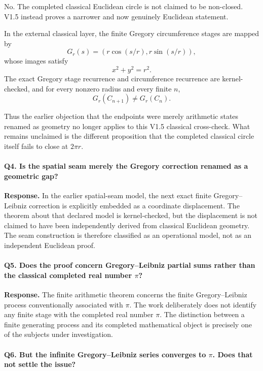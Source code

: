 \documentclass[11pt,a4paper]{article}
\begin{document}
No.  The completed classical Euclidean circle is not claimed to be
non-closed.  V1.5 instead proves a narrower and now genuinely
Euclidean statement.

In the external classical layer, the finite Gregory circumference
stages are mapped by
\[
G_r(s)
=
\left(
r\cos(s/r),
r\sin(s/r)
\right),
\]
whose images satisfy
\[
x^2+y^2=r^2.
\]
The exact Gregory stage recurrence and circumference recurrence are
kernel-checked, and for every nonzero radius and every finite $n$,
\[
G_r(C_{n+1})
\neq
G_r(C_n).
\]

Thus the earlier objection that the endpoints were merely arithmetic
states renamed as geometry no longer applies to this V1.5 classical
cross-check.  What remains unclaimed is the different proposition
that the completed classical circle itself fails to close at
$2\pi r$.

\paragraph{Q4. Is the spatial seam merely the Gregory correction renamed as a geometric gap?}

\textbf{Response.}
In the earlier spatial-seam model, the next exact finite
Gregory--Leibniz correction is explicitly embedded as a coordinate
displacement. The theorem about that declared model is kernel-checked,
but the displacement is not claimed to have been independently derived
from classical Euclidean geometry. The seam construction is therefore
classified as an operational model, not as an independent Euclidean
proof.

\paragraph{Q5. Does the proof concern Gregory--Leibniz partial sums rather than the classical completed real number \(\pi\)?}

\textbf{Response.}
The finite arithmetic theorem concerns the finite Gregory--Leibniz
process conventionally associated with \(\pi\). The work deliberately
does not identify any finite stage with the completed real number
\(\pi\). The distinction between a finite generating process and its
completed mathematical object is precisely one of the subjects under
investigation.

\paragraph{Q6. But the infinite Gregory--Leibniz series converges to \(\pi\). Does that not settle the issue?}
\end{document}
